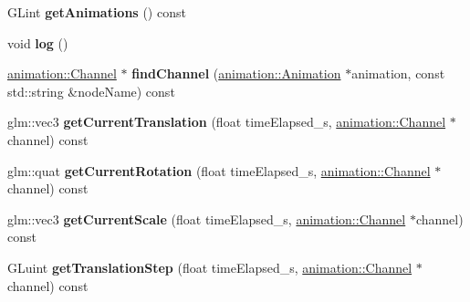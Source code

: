 \begin{DoxyCompactItemize}
\item 
\hypertarget{classfillwave_1_1manager_1_1BoneManager_a9a50753678c0d73447e8d208c7c425ce}{}G\+Lint {\bfseries get\+Animations} () const \label{classfillwave_1_1manager_1_1BoneManager_a9a50753678c0d73447e8d208c7c425ce}

\item 
\hypertarget{classfillwave_1_1manager_1_1BoneManager_a911019fc466242c6bf5185910497a47d}{}void {\bfseries log} ()\label{classfillwave_1_1manager_1_1BoneManager_a911019fc466242c6bf5185910497a47d}

\item 
\hypertarget{classfillwave_1_1manager_1_1BoneManager_aeb7f233428d999ae9a971f3405388f8b}{}\hyperlink{classfillwave_1_1animation_1_1Channel}{animation\+::\+Channel} $\ast$ {\bfseries find\+Channel} (\hyperlink{classfillwave_1_1animation_1_1Animation}{animation\+::\+Animation} $\ast$animation, const std\+::string \&node\+Name) const \label{classfillwave_1_1manager_1_1BoneManager_aeb7f233428d999ae9a971f3405388f8b}

\item 
\hypertarget{classfillwave_1_1manager_1_1BoneManager_ab1d39b93444cb957517d541e9868fcea}{}glm\+::vec3 {\bfseries get\+Current\+Translation} (float time\+Elapsed\+\_\+s, \hyperlink{classfillwave_1_1animation_1_1Channel}{animation\+::\+Channel} $\ast$channel) const \label{classfillwave_1_1manager_1_1BoneManager_ab1d39b93444cb957517d541e9868fcea}

\item 
\hypertarget{classfillwave_1_1manager_1_1BoneManager_ae2995525688dca9b8ef6cb732dea565d}{}glm\+::quat {\bfseries get\+Current\+Rotation} (float time\+Elapsed\+\_\+s, \hyperlink{classfillwave_1_1animation_1_1Channel}{animation\+::\+Channel} $\ast$channel) const \label{classfillwave_1_1manager_1_1BoneManager_ae2995525688dca9b8ef6cb732dea565d}

\item 
\hypertarget{classfillwave_1_1manager_1_1BoneManager_abe6bd237a2ff573c69622feb85ab79e2}{}glm\+::vec3 {\bfseries get\+Current\+Scale} (float time\+Elapsed\+\_\+s, \hyperlink{classfillwave_1_1animation_1_1Channel}{animation\+::\+Channel} $\ast$channel) const \label{classfillwave_1_1manager_1_1BoneManager_abe6bd237a2ff573c69622feb85ab79e2}

\item 
\hypertarget{classfillwave_1_1manager_1_1BoneManager_a6a351ab1f28023d6d96a326507e290e6}{}G\+Luint {\bfseries get\+Translation\+Step} (float time\+Elapsed\+\_\+s, \hyperlink{classfillwave_1_1animation_1_1Channel}{animation\+::\+Channel} $\ast$channel) const \label{classfillwave_1_1manager_1_1BoneManager_a6a351ab1f28023d6d96a326507e290e6}


\end{DoxyCompactItemize}
